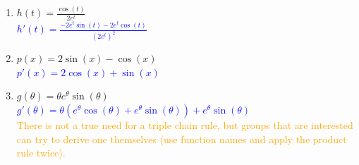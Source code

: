 \documentclass{ximera}
\begin{document}
\begin{exercise}
\begin{enumerate}
            \item $h(t)=\frac{\cos(t)}{2e^t}$ \\
            \textcolor{blue}{ $h'(t)=\frac{-2e^t\sin(t)-2e^t\cos(t)}{(2e^t)^2}$}

            \item $p(x)=2\sin(x)-\cos(x)$\\
            \textcolor{blue}{ $p'(x)=2\cos(x)+\sin(x)$}

            \item $g(\theta)=\theta e^\theta \sin(\theta)$\\
            \textcolor{blue}{ $g'(\theta)=\theta(e^\theta \cos(\theta)+e^\theta \sin(\theta))+e^\theta\sin(\theta)$\\}
            \textcolor{orange}{There is not a true need for a triple chain rule, but groups that are interested can try to derive one themselves (use function names and apply the product rule twice). }
    \end{enumerate}
\end{exercise}
\end{document}
